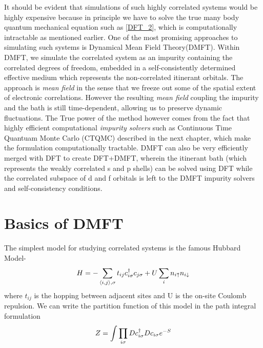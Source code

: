 \documentclass[10pt]{ruthesis}
\begin{document}
It should be evident that simulations of such highly correlated systems would be highly expensive because in principle we have to solve the true many body quantum mechanical equation such as \ref{DFT_2}, which is computationally intractable as mentioned earlier. One of the most promising approaches to simulating such systems is Dynamical Mean Field Theory(DMFT). Within DMFT, we simulate the correlated system as an impurity containing the correlated degrees of freedom, embedded in a self-consistently determined effective medium which represents the non-correlated itinerant orbitals. The approach is \textit{mean field} in the sense that we freeze out some of the spatial extent of electronic correlations. However the resulting \textit{mean field} coupling the impurity and the bath is still time-dependent, allowing us to preserve dynamic fluctuations. The True power of the method however comes from the fact that highly efficient computational \textit{impurity solvers} such as Continuous Time Quantuam Monte Carlo (CTQMC) described in the next chapter, which make the formulation computationally tractable. DMFT can also be very efficiently merged with DFT to create DFT+DMFT, wherein the itinerant bath (which represents the weakly correlated s and p shells) can be solved using DFT while the correlated subspace of d and f orbitals is left to the DMFT impurity solvers and self-consistency conditions.

\section{Basics of DMFT}

The simplest model for studying correlated systems is the famous Hubbard Model-
\begin{equation}
H=- \sum_{\langle i,j \rangle, \sigma} t_{ij} c^{\dagger}_{i \sigma} c_{j\sigma} + U \sum_{i} n_{i\uparrow} n_{i \downarrow}
\end{equation}
 where $t_{ij} $ is the hopping between adjacent sites and U is the on-site Coulomb repulsion.  We can write the partition function of this model in the path integral formulation 
 \begin{equation}\label{Part}
 Z=\int \prod_{i\sigma} D c^{\dagger}_{i\sigma} D c_{i\sigma} e^{-S}
 \end{equation}
\end{document}
